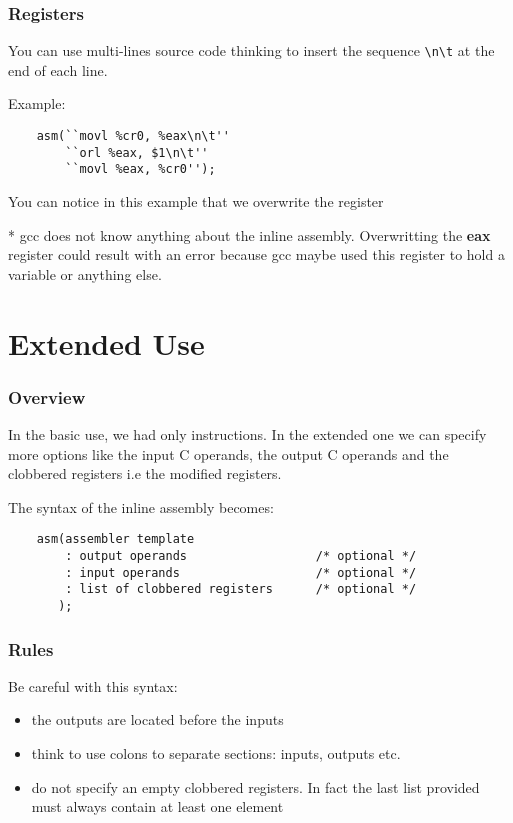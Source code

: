 
\begin{frame}[containsverbatim]
  \frametitle{Registers}

  You can use multi-lines source code thinking to insert the sequence
  \verb|\n\t| at the end of each line.

  \-

  Example:

  \begin{verbatim}
    asm(``movl %cr0, %eax\n\t''
        ``orl %eax, $1\n\t''
        ``movl %eax, %cr0'');
  \end{verbatim}

  You can notice in this example that we overwrite the register %

  \-

  \alert{*} gcc does not know anything about the inline assembly.
  Overwritting the \textbf{eax} register could result with an error because
  gcc maybe used this register to hold a variable or anything else.
\end{frame}

%
%

\section{Extended Use}


\begin{frame}[containsverbatim]
  \frametitle{Overview}

  In the basic use, we had only instructions. In the extended one
  we can specify more options like the input C operands, the
  output C operands and the clobbered registers i.e the
  modified registers.

  \-

  The syntax of the inline assembly becomes:

  \begin{verbatim}
    asm(assembler template
        : output operands                  /* optional */
        : input operands                   /* optional */
        : list of clobbered registers      /* optional */
       );
  \end{verbatim}
\end{frame}


\begin{frame}
  \frametitle{Rules}

  Be careful with this syntax:

  \begin{itemize}[<+->]
    \item
      the outputs are located before the inputs
    \item
      think to use colons to separate sections: inputs, outputs etc.
    \item
      do not specify an empty clobbered registers. In fact the
      last list provided must always contain at least one element
  \end{itemize}
\end{frame}

